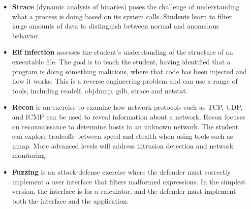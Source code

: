 \documentclass[11pt]{report}
\newcommand{\eat}[1]{}
\begin{document}
\begin{itemize}
\item {\bf Strace} (dynamic analysis of binaries) poses the challenge of 
 understanding what
a process is doing based on its system calls.  Students learn to filter large 
amounts of data to distinguish between normal and anomalous behavior.

\item {\bf Elf infection} assesses the student's understanding 
of the structure of an executable file.  The goal is to teach the student, having identified that a program is 
doing something malicious, where that code has been injected and how it works.  This 
is a reverse engineering problem and can use a range of tools, including readelf, objdump, gdb, 
strace and netstat.

\item {\bf Recon} is an exercise to examine how network protocols such as TCP, UDP, and ICMP 
can be used to reveal information about a network.  Recon 
focuses on reconnaissance to determine hosts in an unknown network. 
The student can explore tradeoffs between speed and stealth
when using tools such as nmap.
More advanced levels will address intrusion detection and network monitoring.

\item {\bf Fuzzing} is an attack-defense exercise where the defender must correctly implement a user 
interface that filters malformed expressions.  In the simplest version, the interface is for a 
calculator, and the defender must implement both the interface and the application.  
\eat{
\item {\bf Scapy Hunt} poses the challenge of analyzing network traffic 
to understand who is communicating with whom and how. The player is trying to get data from an ftp server
which is not on the same subnet, but one of the hosts on its network is communicating with it.
By default the player can only see packets sent to the server and must craft packets to get them routed
to the target and get a response back.

\item {\bf Firewall} is still being implemented.  It requires students to understand the 
interactions between multiple firewalls which have different rule sets.
} %
\end{itemize}


\end{document}
